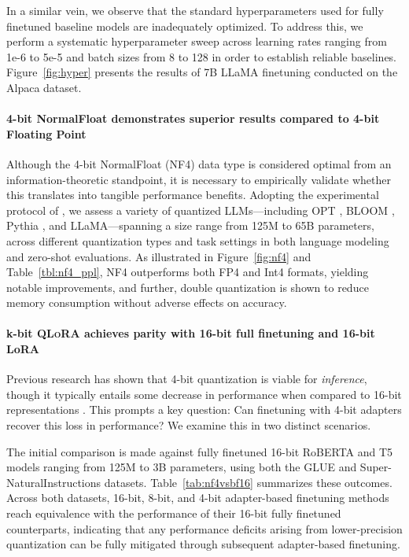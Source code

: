 In a similar vein, we observe that the standard hyperparameters used for fully finetuned baseline models are inadequately optimized. To address this, we perform a systematic hyperparameter sweep across learning rates ranging from 1e-6 to 5e-5 and batch sizes from 8 to 128 in order to establish reliable baselines. Figure~\ref{fig:hyper} presents the results of 7B LLaMA finetuning conducted on the Alpaca dataset.

\paragraph{4-bit NormalFloat demonstrates superior results compared to 4-bit Floating Point}

Although the 4-bit NormalFloat (NF4) data type is considered optimal from an information-theoretic standpoint, it is necessary to empirically validate whether this translates into tangible performance benefits. Adopting the experimental protocol of \citet{dettmers2022case}, we assess a variety of quantized LLMs—including OPT \citep{zhang2022opt}, BLOOM \cite{scao2022bloom}, Pythia \cite{biderman2023pythia}, and LLaMA—spanning a size range from 125M to 65B parameters, across different quantization types and task settings in both language modeling and zero-shot evaluations. As illustrated in Figure~\ref{fig:nf4} and Table~\ref{tbl:nf4_ppl}, NF4 outperforms both FP4 and Int4 formats, yielding notable improvements, and further, double quantization is shown to reduce memory consumption without adverse effects on accuracy.

\paragraph{k-bit \textsc{QLoRA} achieves parity with 16-bit full finetuning and 16-bit LoRA}

Previous research has shown that 4-bit quantization is viable for \emph{inference}, though it typically entails some decrease in performance when compared to 16-bit representations \citep{dettmers2022case,frantar2022gptq}. This prompts a key question: Can finetuning with 4-bit adapters recover this loss in performance? We examine this in two distinct scenarios.

The initial comparison is made against fully finetuned 16-bit RoBERTA and T5 models ranging from 125M to 3B parameters, using both the GLUE and Super-NaturalInstructions datasets. Table~\ref{tab:nf4vsbf16} summarizes these outcomes. Across both datasets, 16-bit, 8-bit, and 4-bit adapter-based finetuning methods reach equivalence with the performance of their 16-bit fully finetuned counterparts, indicating that any performance deficits arising from lower-precision quantization can be fully mitigated through subsequent adapter-based finetuning.


